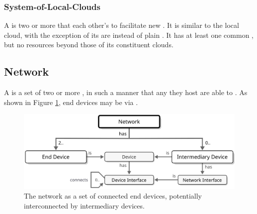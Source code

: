 \subsubsection{System-of-Local-Clouds}
\label{sec:reference-model:system-of-systems:system-of-local-clouds}

A  is two or more  that  each other's  to facilitate new .
It is similar to the local cloud, with the exception of its  are  instead of plain .
It has at least one common , but no resources beyond those of its constituent clouds.

\subsection{Network}
\label{sec:reference-model:network}

A  is a set of two or more ,  in such a manner that any  they host are able to .
As shown in Figure \ref{fig:network}, end devices may be  via .

\begin{figure}[ht!]
  \centering
  \includegraphics[scale=0.9]{figures/network}
  \caption{
    The network as a set of connected end devices, potentially interconnected by intermediary devices.
  }
  \label{fig:network}
\end{figure}

